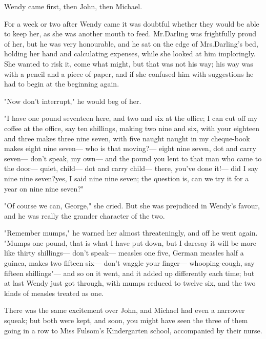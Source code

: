 Wendy came first, then John, then Michael.

For a week or two after Wendy came it was doubtful whether they would be able to keep her,
as she was another mouth to feed.
Mr.\@ Darling was frightfully proud of her, but he was very honourable,
and he sat on the edge of Mrs.\@ Darling's bed, holding her hand and calculating expenses,
while she looked at him imploringly.
She wanted to risk it, come what might, but that was not his way;
his way was with a pencil and a piece of paper,
and if she confused him with suggestions he had to begin at the beginning again.

"Now don't interrupt," he would beg of her.

"I have one pound seventeen here, and two and six at the office;
I can cut off my coffee at the office, say ten shillings, making two nine and six,
with your eighteen and three makes three nine seven,
with five naught naught in my cheque-book makes eight nine seven—%
who is that moving?—%
eight nine seven, dot and carry seven—%
don't speak, my own—%
and the pound you lent to that man who came to the door—%
quiet, child—%
dot and carry child—%
there, you've done it!—%
did I say nine nine seven?\@ yes, I said nine nine seven;
the question is, can we try it for a year on nine nine seven?"

"Of course we can, George," she cried.
But she was prejudiced in Wendy's favour, and he was really the grander character of the two.

"Remember mumps," he warned her almost threateningly, and off he went again.
"Mumps one pound, that is what I have put down,
but I daresay it will be more like thirty shillings—%
don't speak—%
measles one five, German measles half a guinea, makes two fifteen six—%
don't waggle your finger—%
whooping-cough, say fifteen shillings"—%
and so on it went, and it added up differently each time;
but at last Wendy just got through,
with mumps reduced to twelve six, and the two kinds of measles treated as one.

There was the same excitement over John,
and Michael had even a narrower squeak;
but both were kept,
and soon, you might have seen the three of them going in a row to Miss Fulsom's Kindergarten school,
accompanied by their nurse.

